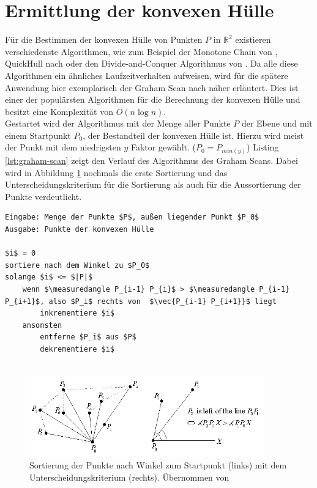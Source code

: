 \section{Ermittlung der konvexen Hülle}

Für die Bestimmen der konvexen Hülle von Punkten \(P\) in \( \mathbb{R}^2\) existieren verschiedenste Algorithmen, wie zum Beispiel der Monotone Chain von \citet{andrew1979another}, QuickHull nach \citet{eddy1977new} oder den Divide-and-Conquer Algorithmus von \citet{preparata1985convex}. Da alle diese Algorithmen ein ähnliches Laufzeitverhalten aufweisen, wird für die spätere Anwendung hier exemplarisch der Graham Scan nach \citet{graham1972efficient} näher erläutert. Dies ist einer der populärsten Algorithmen für die Berechnung der konvexen Hülle und besitzt eine Komplexität von \(O(n \log n)\).\\

Gestartet wird der Algorithmus mit der Menge aller Punkte \(P\) der Ebene und mit einem Startpunkt \(P_0\), der Bestandteil der konvexen Hülle ist. Hierzu wird meist der Punkt mit dem niedrigsten \(y\) Faktor gewählt. (\(P_0=P_{min(y)}\)) Listing \ref{lst:graham-scan} zeigt den Verlauf des Algorithmus des Graham Scans. Dabei wird in Abbildung \ref{fig:convexhull} nochmals die erste Sortierung und das Unterscheidungskriterium für die Sortierung als auch für die Aussortierung der Punkte verdeutlicht. \citep{convexHull} \\


\begin{lstlisting}[mathescape,caption=Graham Scan Algorithmus, label=lst:graham-scan, float=htbp]
Eingabe: Menge der Punkte $P$, außen liegender Punkt $P_0$
Ausgabe: Punkte der konvexen Hülle

$i$ = 0
sortiere nach dem Winkel zu $P_0$
solange $i$ <= $|P|$
    wenn $\measuredangle P_{i-1} P_{i}$ > $\measuredangle P_{i-1} P_{i+1}$, also $P_i$ rechts von  $\vec{P_{i-1} P_{i+1}}$ liegt
        inkrementiere $i$
    ansonsten
        entferne $P_i$ aus $P$
        dekrementiere $i$
    
\end{lstlisting} 

\begin{figure}[h]
  \centering
	\includegraphics[width=0.9\textwidth]{content/images/methods/convexhull.png} 
  \caption{Sortierung der Punkte nach Winkel zum Startpunkt (links) mit dem Unterscheidungskriterium (rechts). Übernommen von \citet{convexHull}}
  \label{fig:convexhull}
\end{figure}
